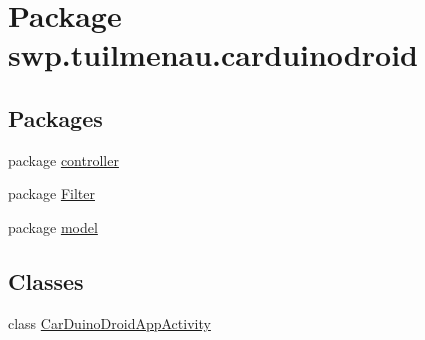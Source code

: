 \hypertarget{namespaceswp_1_1tuilmenau_1_1carduinodroid}{}\section{Package swp.\+tuilmenau.\+carduinodroid}
\label{namespaceswp_1_1tuilmenau_1_1carduinodroid}
\subsection*{Packages}
\begin{DoxyCompactItemize}
\item 
package \hyperlink{namespaceswp_1_1tuilmenau_1_1carduinodroid_1_1controller}{controller}
\item 
package \hyperlink{namespaceswp_1_1tuilmenau_1_1carduinodroid_1_1_filter}{Filter}
\item 
package \hyperlink{namespaceswp_1_1tuilmenau_1_1carduinodroid_1_1model}{model}
\end{DoxyCompactItemize}
\subsection*{Classes}
\begin{DoxyCompactItemize}
\item 
class \hyperlink{classswp_1_1tuilmenau_1_1carduinodroid_1_1_car_duino_droid_app_activity}{Car\+Duino\+Droid\+App\+Activity}
\end{DoxyCompactItemize}
